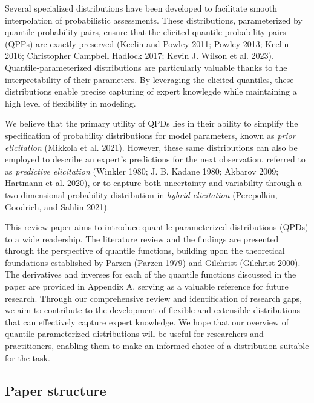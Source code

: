 \documentclass[
]{interact}
\begin{document}
Several specialized distributions have been developed to facilitate
smooth interpolation of probabilistic assessments. These distributions,
parameterized by quantile-probability pairs, ensure that the elicited
quantile-probability pairs (QPPs) are exactly preserved (Keelin and
Powley 2011; Powley 2013; Keelin 2016; Christopher Campbell Hadlock
2017; Kevin J. Wilson et al. 2023). Quantile-parameterized distributions
are particularly valuable thanks to the interpretability of their
parameters. By leveraging the elicited quantiles, these distributions
enable precise capturing of expert knowlegde while maintaining a high
level of flexibility in modeling.

We believe that the primary utility of QPDs lies in their ability to
simplify the specification of probability distributions for model
parameters, known as \emph{prior elicitation} (Mikkola et al. 2021).
However, these same distributions can also be employed to describe an
expert's predictions for the next observation, referred to as
\emph{predictive elicitation} (Winkler 1980; J. B. Kadane 1980; Akbarov
2009; Hartmann et al. 2020), or to capture both uncertainty and
variability through a two-dimensional probability distribution in
\emph{hybrid elicitation} (Perepolkin, Goodrich, and Sahlin 2021).

This review paper aims to introduce quantile-parameterized distributions
(QPDs) to a wide readership. The literature review and the findings are
presented through the perspective of quantile functions, building upon
the theoretical foundations established by Parzen (Parzen 1979) and
Gilchrist (Gilchrist 2000). The derivatives and inverses for each of the
quantile functions discussed in the paper are provided in Appendix A,
serving as a valuable reference for future research. Through our
comprehensive review and identification of research gaps, we aim to
contribute to the development of flexible and extensible distributions
that can effectively capture expert knowledge. We hope that our overview
of quantile-parameterized distributions will be useful for researchers
and practitioners, enabling them to make an informed choice of a
distribution suitable for the task.

\subsection*{Paper structure}\label{paper-structure}
\end{document}
